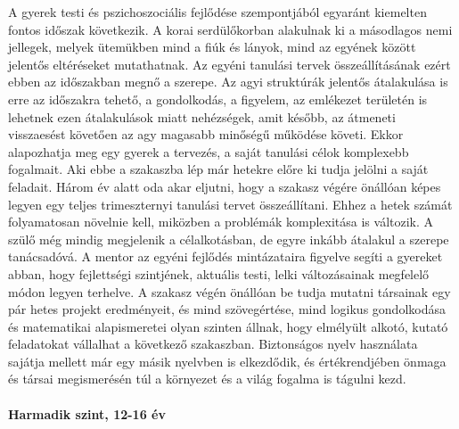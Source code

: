 A gyerek testi és pszichoszociális fejlődése szempontjából egyaránt
kiemelten fontos időszak következik. A korai serdülőkorban alakulnak ki a
másodlagos nemi jellegek, melyek ütemükben mind a fiúk és lányok, mind az
egyének között jelentős eltéréseket mutathatnak. Az egyéni tanulási tervek
összeállításának ezért ebben az időszakban megnő a szerepe. Az agyi struktúrák
jelentős átalakulása is erre az időszakra tehető, a gondolkodás, a figyelem, az
emlékezet területén is lehetnek ezen átalakulások miatt nehézségek, amit
később, az átmeneti visszaesést követően az agy magasabb minőségű működése
követi. Ekkor alapozhatja meg egy gyerek a tervezés, a saját tanulási célok
komplexebb fogalmait. Aki ebbe a szakaszba lép már hetekre előre ki tudja
jelölni a saját feladait. Három év alatt oda akar eljutni, hogy a szakasz
végére önállóan képes legyen egy teljes trimeszternyi tanulási tervet
összeállítani. Ehhez a hetek számát folyamatosan növelnie kell, miközben a
problémák komplexitása is változik. A szülő még mindig megjelenik a
célalkotásban, de egyre inkább átalakul a szerepe tanácsadóvá. A mentor az
egyéni fejlődés mintázataira figyelve segíti a gyereket abban, hogy fejlettségi
szintjének, aktuális testi, lelki változásainak megfelelő módon legyen
terhelve.
A szakasz végén önállóan be tudja mutatni társainak egy pár hetes projekt
eredményeit, és mind szövegértése, mind logikus gondolkodása és matematikai
alapismeretei olyan szinten állnak, hogy elmélyült alkotó, kutató feladatokat
vállalhat a következő szakaszban. Biztonságos nyelv használata sajátja mellett
már egy másik nyelvben is elkezdődik, és értékrendjében önmaga és társai
megismerésén túl a környezet és a világ fogalma is tágulni kezd.

\paragraph{Harmadik szint, 12-16 év}

